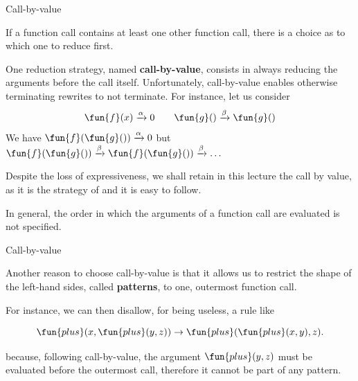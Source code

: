 %
\begin{frame}{Call-by-value}

  If a function call contains at least one other function call, there
  is a choice as to which one to reduce first.

  \bigskip

  One reduction strategy, named \textbf{call-by-value}, consists in
  always reducing the arguments before the call itself. Unfortunately,
  call-by-value enables otherwise terminating rewrites to not
  terminate. For instance, let us consider
  \begin{equation*}
    \fun{f}(x) \xrightarrow{\alpha} 0\qquad
    \fun{g}() \xrightarrow{\beta} \fun{g}()
  \end{equation*}
  We have \(\fun{f}(\fun{g}()) \xrightarrow{\alpha} 0\) but
  \(\fun{f}(\fun{g}()) \xrightarrow{\beta} \fun{f}(\fun{g}())
  \xrightarrow{\beta} \dots\)

  \bigskip

  Despite the loss of expressiveness, we shall retain in this lecture
  the call by value, as it is the strategy of \OCaml and it is easy to
  follow.

  \bigskip

  In general, the order in which the arguments of a function call are
  evaluated is not specified.

\end{frame}

%
\begin{frame}{Call-by-value}

  Another reason to choose call-by-value is that it allows us to
  restrict the shape of the left\hyp{}hand sides, called
  \textbf{patterns}, to one, outermost function call.

  \bigskip

  For instance, we can then disallow, for being useless, a
  rule like

  \begin{equation*}
    \fun{plus}(x,\fun{plus}(y,z)) \rightarrow
    \fun{plus}(\fun{plus}(x,y),z).
  \end{equation*}

  \noindent because, following call\hyp{}by\hyp{}value, the argument
  \(\fun{plus}(y,z)\) must be evaluated before the outermost call,
  therefore it cannot be part of any pattern.

\end{frame}

